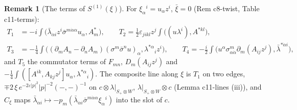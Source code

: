 \documentclass[11pt]{article}
\numberwithin{equation}{section}
\theoremstyle{plain}
\theoremstyle{definition}
\newtheorem{remark}[theorem]{Remark}
\begin{document}
\begin{remark}[The terms of $S^{(1)}(\xi)$]
\label{rem:op-tc-terms}
For $\xi_\alpha{}^i=u_\alpha z^i$, $\bar\xi=0$ (Rem c8-twist, Table c11-terms):
\[
\begin{aligned}
T_1&=-i\int\big(\bar\lambda_{\dot\alpha i}z^i\bar\sigma^{m\dot\alpha\alpha}u_\alpha,A^*_m\big),\qquad T_2=\tfrac12\varepsilon_{jikl}z^j\int\big((u\lambda^i),A^{*kl}\big),\\
T_3&=-\tfrac14\int\big((\partial_mA_n-\partial_nA_m)(\sigma^m\bar\sigma^nu)_\alpha,\lambda^{*\alpha}{}_iz^i\big),\qquad T_4=-\tfrac i2\int\big(u^\alpha\sigma^m_{\alpha\dot\alpha}\partial_m(A_{ij}z^j),\bar\lambda^{*\dot\alpha i}\big),
\end{aligned}
\]
and $T_5$ the commutator terms of $F_{mn}$, $D_m(A_{ij}z^j)$ and $-\tfrac14\int([A^{ik},A_{kj}z^j]u_\alpha,\lambda^{*\alpha}{}_i)$. The composite line along $\xi$ is $T_1$ on two edges, $\mp2\,\xi\,e^{-2\varepsilon|p|^2}|p|^{-2}(-,-)^{-1}$ on $c\otimes\lambda|_{S_+\otimes W}$, $\lambda|_{S_+\otimes W}\otimes c$ (Lemma c11-lines (iii)), and $C_\xi$ maps $\bar\lambda_{\dot\alpha i}\mapsto-p_m(\bar\lambda_{\dot\alpha i}\bar\sigma^{m\dot\alpha\alpha}\xi_\alpha{}^i)$ into the slot of $c$.
\end{remark}
\end{document}
